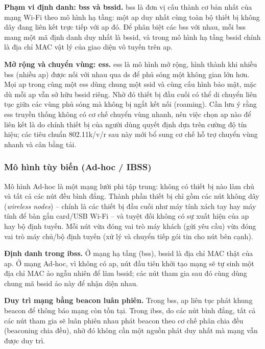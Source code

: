 \textbf{Phạm vi định danh: \ac{bss} và \ac{bssid}.} \ac{bss} là đơn vị cấu
thành cơ bản nhất của mạng Wi-Fi theo mô hình hạ tầng: một \ac{ap} duy nhất cùng
toàn bộ thiết bị không dây đang liên kết trực tiếp với \ac{ap} đó. Để phân biệt
các \ac{bss} với nhau, mỗi \ac{bss} mang một mã định danh duy nhất là
\ac{bssid}, và trong mô hình hạ tầng \ac{bssid} chính là địa chỉ MAC vật lý của
giao diện vô tuyến trên \ac{ap}.

\textbf{Mở rộng và chuyển vùng: \ac{ess}.} \ac{ess} là mô hình mở rộng, hình
thành khi nhiều \ac{bss} (nhiều \ac{ap}) được nối với nhau qua \ac{ds} để phủ
sóng một không gian lớn hơn. Mọi \ac{ap} trong cùng một \ac{ess} dùng chung một
\ac{ssid} và cùng cấu hình bảo mật, mặc dù mỗi \ac{ap} vẫn sở hữu
\ac{bssid} riêng. Nhờ đó thiết bị đầu cuối có thể di chuyển liên tục giữa các
vùng phủ sóng mà không bị ngắt kết nối (roaming). Cần lưu ý rằng \ac{ess}
truyền thống không có cơ chế chuyển vùng nhanh, nên việc chọn \ac{ap} nào để
liên kết là do chính thiết bị của người dùng quyết định dựa trên cường độ tín
hiệu; các tiêu chuẩn 802.11k/v/r sau này mới bổ sung cơ chế hỗ trợ chuyển vùng
nhanh và cân bằng tải.

\subsubsection{Mô hình tùy biến (Ad-hoc / IBSS)}

Mô hình Ad-hoc là một mạng lưới phi tập trung: không có thiết bị nào làm chủ và
tất cả các nút đều bình đẳng. Thành phần thiết bị chỉ gồm các nút không dây
(\emph{wireless nodes}) -- chính là các thiết bị đầu cuối như máy tính xách tay
hay máy tính để bàn gắn card/USB Wi-Fi -- và tuyệt đối không có sự xuất hiện
của \ac{ap} hay bộ định tuyến. Mỗi nút vừa đóng vai trò máy khách (gửi yêu cầu)
vừa đóng vai trò máy chủ/bộ định tuyến (xử lý và chuyển tiếp gói tin cho nút bên
cạnh).

\textbf{Định danh trong \ac{ibss}.} Ở mạng hạ tầng (\ac{bss}), \ac{bssid} là địa
chỉ MAC thật của \ac{ap}. Ở mạng Ad-hoc, vì không có \ac{ap}, nút đầu tiên khởi
tạo mạng sẽ tự sinh một địa chỉ MAC ảo ngẫu nhiên để làm \ac{bssid}; các nút
tham gia sau đó cùng dùng chung mã \ac{bssid} ảo này để nhận diện nhau.

\textbf{Duy trì mạng bằng beacon luân phiên.} Trong \ac{bss}, \ac{ap} liên tục
phát khung beacon để thông báo mạng còn tồn tại. Trong \ac{ibss}, do các nút
bình đẳng, tất cả các nút tham gia sẽ luân phiên nhau phát beacon theo cơ chế
phân chia đều (beaconing chia đều), nhờ đó không cần một nguồn phát duy nhất mà
mạng vẫn được duy trì.

